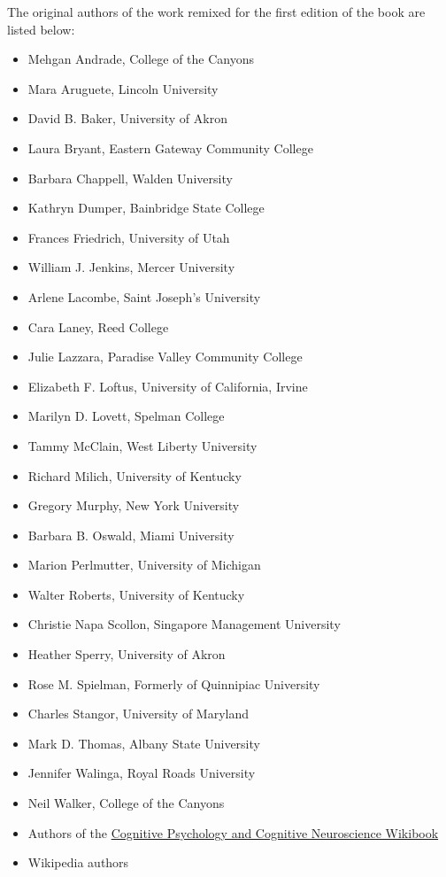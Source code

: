 \documentclass[
]{krantz}
\providecommand{\tightlist}{%
  \setlength{\itemsep}{0pt}\setlength{\parskip}{0pt}}
\begin{document}
The original authors of the work remixed for the first edition of the book are listed below:

\begin{itemize}
\tightlist
\item
  Mehgan Andrade, College of the Canyons
\item
  Mara Aruguete, Lincoln University
\item
  David B. Baker, University of Akron
\item
  Laura Bryant, Eastern Gateway Community College
\item
  Barbara Chappell, Walden University
\item
  Kathryn Dumper, Bainbridge State College
\item
  Frances Friedrich, University of Utah
\item
  William J. Jenkins, Mercer University
\item
  Arlene Lacombe, Saint Joseph's University
\item
  Cara Laney, Reed College
\item
  Julie Lazzara, Paradise Valley Community College
\item
  Elizabeth F. Loftus, University of California, Irvine
\item
  Marilyn D. Lovett, Spelman College
\item
  Tammy McClain, West Liberty University
\item
  Richard Milich, University of Kentucky
\item
  Gregory Murphy, New York University
\item
  Barbara B. Oswald, Miami University
\item
  Marion Perlmutter, University of Michigan
\item
  Walter Roberts, University of Kentucky
\item
  Christie Napa Scollon, Singapore Management University
\item
  Heather Sperry, University of Akron
\item
  Rose M. Spielman, Formerly of Quinnipiac University
\item
  Charles Stangor, University of Maryland
\item
  Mark D. Thomas, Albany State University
\item
  Jennifer Walinga, Royal Roads University
\item
  Neil Walker, College of the Canyons
\item
  Authors of the \href{https://en.wikibooks.org/wiki/Cognitive_Psychology_and_Cognitive_Neuroscience}{Cognitive Psychology and Cognitive Neuroscience Wikibook}
\item
  Wikipedia authors
\end{itemize}
\end{document}
